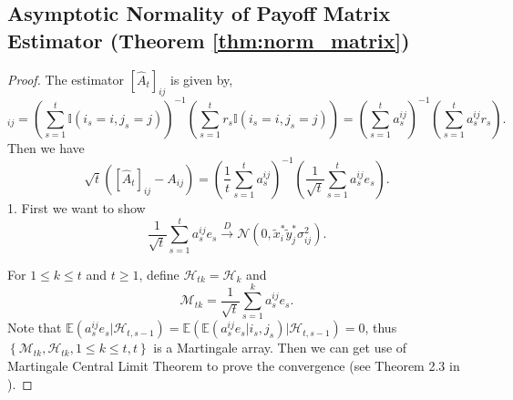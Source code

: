 \documentclass[12pt]{article}
\begin{document}
\subsection{Asymptotic Normality of Payoff Matrix Estimator (Theorem \ref{thm:norm_matrix})}
\label{app:norm_matrix_proof}

\begin{proof}
The estimator $[\widehat{A}_t]_{ij}$ is given by,
\begin{equation*}
    [\widehat{A}_t]_{ij} = \left(\sum_{s=1}^{t} \mathbb{I}(i_s=i,j_s=j) \right)^{-1} \left( \sum_{s=1}^{t}r_s \mathbb{I}(i_s=i,j_s=j) \right) = \left(\sum_{s=1}^{t} a_s^{ij} \right)^{-1} \left( \sum_{s=1}^{t} a_s^{ij} r_s \right).
\end{equation*}
Then we have
\begin{equation*}
    \sqrt{t}\left([\widehat{A}_t]_{ij} - A_{ij}\right) = \left(\frac{1}{t}\sum_{s=1}^{t} a_s^{ij} \right)^{-1} \left(\frac{1}{\sqrt{t}}\sum_{s=1}^{t} a_s^{ij} e_s\right).
\end{equation*}
1. First we want to show 
$$\frac{1}{\sqrt{t}} \sum_{s=1}^{t}a_s^{ij} e_s\stackrel{D}{\to} \mathcal{N}\left(0,\widetilde{x}_i^\ast \widetilde{y}_j^\ast \sigma_{ij}^2 \right).$$

For $1 \le k \le t$ and $t \ge 1$, define $\mathcal{H}_{tk} = \mathcal{H}_k$ and
\[
\mathcal M_{tk} = \frac{1}{\sqrt{t}} \sum_{s=1}^k a_s^{ij} e_s.
\]
Note that $\mathbb{E}\left( a_s^{ij} e_s \vert \mathcal{H}_{t,s-1} \right) = \mathbb{E}\left(\mathbb{E}\left(a_s^{ij} e_s \vert i_s,j_s \right)\vert \mathcal{H}_{t,s-1} \right)=0$, thus $\left\{\mathcal M_{tk},\mathcal{H}_{tk}, 1\le k\le t,t\right\}$ is a Martingale array. Then we can get use of Martingale Central Limit Theorem to prove the convergence (see Theorem 2.3 in \citet{hall1980martingale}).


\end{proof}
\end{document}
